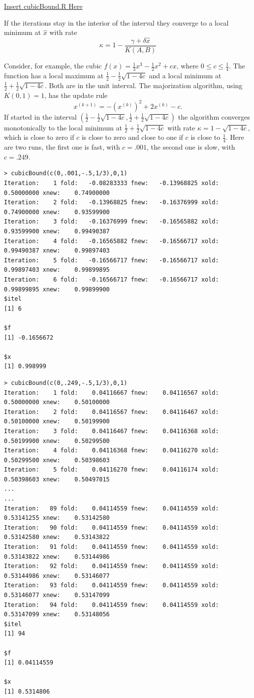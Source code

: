 \documentclass[
  12pt,
]{book}
\begin{document}
\href{../code/cubicBound.R}{Insert cubicBound.R Here}

If the iterations stay in the interior of the interval they converge to a local minimum at \(\hat x\) with rate
\[
\kappa=1-\frac{\gamma+\delta\hat x}{K(A,B)}
\]

Consider, for example, the cubic \(f(x)=\frac13 x^3-\frac12 x^2+cx\),
where \(0\leq c\leq\frac14\). The function has a local maximum at \(\frac12-\frac12\sqrt{1-4c}\) and a local minimum at \(\frac12+\frac12\sqrt{1-4c}\).
Both are in the unit interval. The majorization algorithm, using \(K(0,1)=1\),
has the update rule
\[
x^{(k+1)}=-(x^{(k)})^2+2x^{(k)}-c.
\]
If started in the interval \((\frac12-\frac12\sqrt{1-4c},\frac12+\frac12\sqrt{1-4c})\) the algorithm converges monotonically to the local minimum at \(\frac12+\frac12\sqrt{1-4c}\) with rate \(\kappa=1-\sqrt{1-4c}\), which is close to zero if \(c\) is close to zero and close to one if \(c\) is close to \(\frac14\).
Here are two runs, the first one is fast, with \(c=.001\), the second one is slow, with \(c=.249\).

\begin{verbatim}
> cubicBound(c(0,.001,-.5,1/3),0,1)
Iteration:    1 fold:   -0.08283333 fnew:   -0.13968825 xold:    0.50000000 xnew:    0.74900000
Iteration:    2 fold:   -0.13968825 fnew:   -0.16376999 xold:    0.74900000 xnew:    0.93599900
Iteration:    3 fold:   -0.16376999 fnew:   -0.16565882 xold:    0.93599900 xnew:    0.99490387
Iteration:    4 fold:   -0.16565882 fnew:   -0.16566717 xold:    0.99490387 xnew:    0.99897403
Iteration:    5 fold:   -0.16566717 fnew:   -0.16566717 xold:    0.99897403 xnew:    0.99899895
Iteration:    6 fold:   -0.16566717 fnew:   -0.16566717 xold:    0.99899895 xnew:    0.99899900
$itel
[1] 6

$f
[1] -0.1656672

$x
[1] 0.998999
\end{verbatim}

\begin{verbatim}
> cubicBound(c(0,.249,-.5,1/3),0,1)
Iteration:    1 fold:    0.04116667 fnew:    0.04116567 xold:    0.50000000 xnew:    0.50100000
Iteration:    2 fold:    0.04116567 fnew:    0.04116467 xold:    0.50100000 xnew:    0.50199900
Iteration:    3 fold:    0.04116467 fnew:    0.04116368 xold:    0.50199900 xnew:    0.50299500
Iteration:    4 fold:    0.04116368 fnew:    0.04116270 xold:    0.50299500 xnew:    0.50398603
Iteration:    5 fold:    0.04116270 fnew:    0.04116174 xold:    0.50398603 xnew:    0.50497015
...
...
Iteration:   89 fold:    0.04114559 fnew:    0.04114559 xold:    0.53141255 xnew:    0.53142580
Iteration:   90 fold:    0.04114559 fnew:    0.04114559 xold:    0.53142580 xnew:    0.53143822
Iteration:   91 fold:    0.04114559 fnew:    0.04114559 xold:    0.53143822 xnew:    0.53144986
Iteration:   92 fold:    0.04114559 fnew:    0.04114559 xold:    0.53144986 xnew:    0.53146077
Iteration:   93 fold:    0.04114559 fnew:    0.04114559 xold:    0.53146077 xnew:    0.53147099
Iteration:   94 fold:    0.04114559 fnew:    0.04114559 xold:    0.53147099 xnew:    0.53148056
$itel
[1] 94

$f
[1] 0.04114559

$x
[1] 0.5314806
\end{verbatim}
\end{document}
